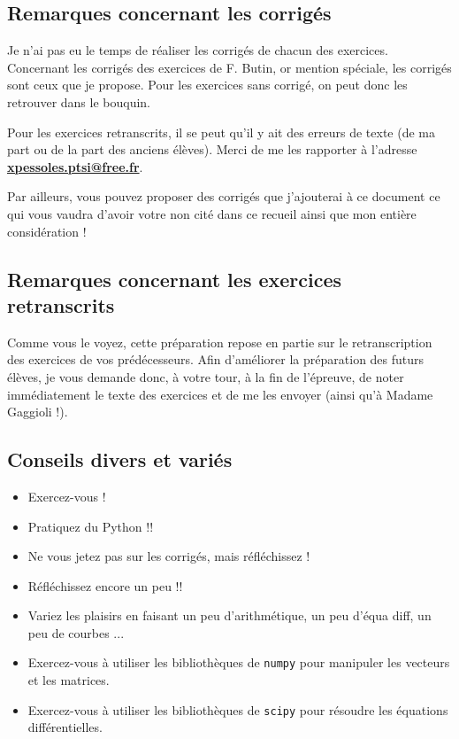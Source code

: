 \documentclass[10pt,fleqn]{article} %
\begin{document}
\subsection*{Remarques concernant les corrigés}
Je n'ai pas eu le temps de réaliser les corrigés de chacun des exercices. Concernant les corrigés des exercices de F. Butin, or mention spéciale, les corrigés sont ceux que je propose. Pour les exercices sans corrigé, on peut donc les retrouver dans le bouquin. 

Pour les exercices retranscrits, il se peut qu'il y ait des erreurs de texte (de ma part ou de la part des anciens élèves). Merci de me les rapporter à l'adresse \textbf{\url{xpessoles.ptsi@free.fr}}. 

Par ailleurs, vous pouvez proposer des corrigés que j'ajouterai à ce document ce qui vous vaudra d'avoir votre non cité dans ce recueil ainsi que mon entière considération !

\subsection*{Remarques concernant les exercices retranscrits}

Comme vous le voyez, cette préparation repose en partie sur le retranscription des exercices de vos prédécesseurs. Afin d'améliorer la préparation des futurs élèves, je vous demande donc, à votre tour, à la fin de l'épreuve, de noter immédiatement le texte des exercices et de me les envoyer (ainsi qu'à Madame Gaggioli !). 

\subsection*{Conseils divers et variés}
\begin{itemize}
\item Exercez-vous !
\item Pratiquez du Python !!
\item Ne vous jetez pas sur les corrigés, mais réfléchissez !
\item Réfléchissez encore un peu !!
\item Variez les plaisirs en faisant un peu d'arithmétique, un peu d'équa diff, un peu de courbes ...
\item Exercez-vous à utiliser les bibliothèques de \texttt{numpy} pour manipuler les vecteurs et les matrices.
\item Exercez-vous à utiliser les bibliothèques de \texttt{scipy} pour résoudre les équations différentielles.
\end{itemize}
\end{document}
